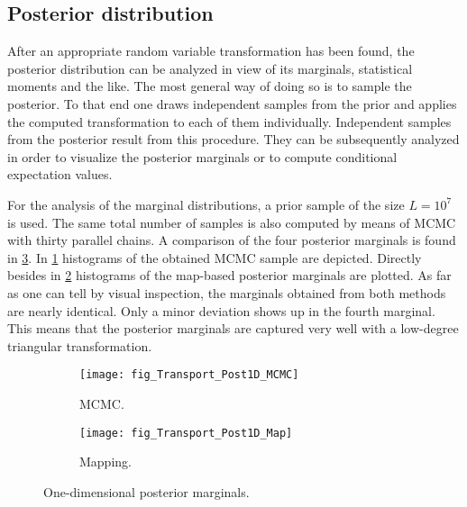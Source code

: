 \subsection{Posterior distribution}
After an appropriate random variable transformation has been found, the posterior distribution can be analyzed in view of its marginals, statistical moments and the like.
The most general way of doing so is to sample the posterior.
To that end one draws independent samples from the prior and applies the computed transformation to each of them individually.
Independent samples from the posterior result from this procedure.
They can be subsequently analyzed in order to visualize the posterior marginals or to compute conditional expectation values.
\par %
For the analysis of the marginal distributions, a prior sample of the size \(L = 10^7\) is used.
The same total number of samples is also computed by means of MCMC with thirty parallel chains.
A comparison of the four posterior marginals is found in \cref{fig:Transport:Post:Marginals1D}.
In \cref{fig:Transport:Post:Marginals1D:MCMC} histograms of the obtained MCMC sample are depicted.
Directly besides in \cref{fig:Transport:Post:Marginals1D:Map} histograms of the map-based posterior marginals are plotted.
As far as one can tell by visual inspection, the marginals obtained from both methods are nearly identical.
Only a minor deviation shows up in the fourth marginal.
This means that the posterior marginals are captured very well with a low-degree triangular transformation.
\begin{figure}[htbp]
  \centering
  \begin{subfigure}[b]{\MAPsubWidth}
    \centering
    \texttt{[image: fig\_Transport\_Post1D\_MCMC]}
    \caption{MCMC.}
    \label{fig:Transport:Post:Marginals1D:MCMC}
  \end{subfigure}\hfill%
  \begin{subfigure}[b]{\MAPsubWidth}
    \centering
    \texttt{[image: fig\_Transport\_Post1D\_Map]}
    \caption{Mapping.}
    \label{fig:Transport:Post:Marginals1D:Map}
  \end{subfigure}%
  \caption[One-dimensional posterior marginals]{One-dimensional posterior marginals.}
  \label{fig:Transport:Post:Marginals1D}
\end{figure}
\par %
